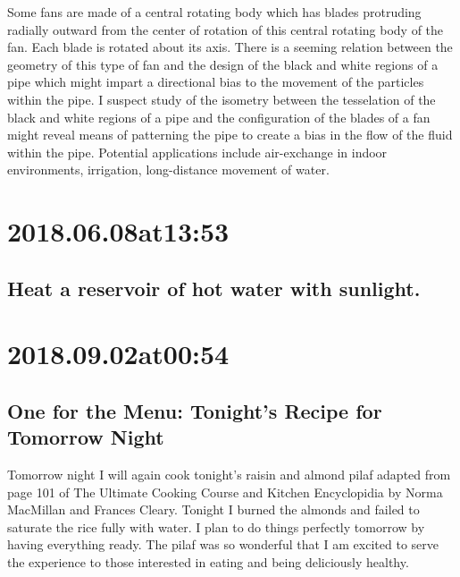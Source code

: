 Some fans are made of a central rotating body which has blades protruding radially outward from the center of rotation of this central rotating body of the fan.
Each blade is rotated about its axis.
There is a seeming relation between the geometry of this type of fan and the design of the black and white regions of a pipe which might impart a directional bias to the movement of the particles within the pipe.
I suspect study of the isometry between the tesselation of the black and white regions of a pipe and the configuration of the blades of a fan might reveal means of patterning the pipe to create a bias in the flow of the fluid within the pipe.
Potential applications include air-exchange in indoor environments, irrigation, long-distance movement of water.

\section*{ 2018.06.08at13:53 }
\subsection*{ Heat a reservoir of hot water with sunlight. }

\section*{ 2018.09.02at00:54 }
\subsection*{ One for the Menu: Tonight's Recipe for Tomorrow Night }
Tomorrow night I will again cook tonight's raisin and almond pilaf adapted from page 101 of The Ultimate Cooking Course and Kitchen Encyclopidia by Norma MacMillan and Frances Cleary.
Tonight I burned the almonds and failed to saturate the rice fully with water.
I plan to do things perfectly tomorrow by having everything ready.
The pilaf was so wonderful that I am excited to serve the experience to those interested in eating and being deliciously healthy.

